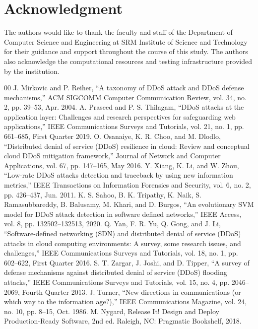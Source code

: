 \documentclass[conference]{IEEEtran}
\begin{document}
\section*{Acknowledgment}

The authors would like to thank the faculty and staff of the Department of Computer Science and Engineering at SRM Institute of Science and Technology for their guidance and support throughout the course of this study. The authors also acknowledge the computational resources and testing infrastructure provided by the institution.

\begin{thebibliography}{00}
 J. Mirkovic and P. Reiher, ``A taxonomy of DDoS attack and DDoS defense mechanisms,'' ACM SIGCOMM Computer Communication Review, vol. 34, no. 2, pp. 39--53, Apr. 2004.
 A. Praseed and P. S. Thilagam, ``DDoS attacks at the application layer: Challenges and research perspectives for safeguarding web applications,'' IEEE Communications Surveys and Tutorials, vol. 21, no. 1, pp. 661--685, First Quarter 2019.
 O. Osanaiye, K. R. Choo, and M. Dlodlo, ``Distributed denial of service (DDoS) resilience in cloud: Review and conceptual cloud DDoS mitigation framework,'' Journal of Network and Computer Applications, vol. 67, pp. 147--165, May 2016.
 Y. Xiang, K. Li, and W. Zhou, ``Low-rate DDoS attacks detection and traceback by using new information metrics,'' IEEE Transactions on Information Forensics and Security, vol. 6, no. 2, pp. 426--437, Jun. 2011.
 K. S. Sahoo, B. K. Tripathy, K. Naik, S. Ramasubbareddy, B. Balusamy, M. Khari, and D. Burgos, ``An evolutionary SVM model for DDoS attack detection in software defined networks,'' IEEE Access, vol. 8, pp. 132502--132513, 2020.
 Q. Yan, F. R. Yu, Q. Gong, and J. Li, ``Software-defined networking (SDN) and distributed denial of service (DDoS) attacks in cloud computing environments: A survey, some research issues, and challenges,'' IEEE Communications Surveys and Tutorials, vol. 18, no. 1, pp. 602--622, First Quarter 2016.
 S. T. Zargar, J. Joshi, and D. Tipper, ``A survey of defense mechanisms against distributed denial of service (DDoS) flooding attacks,'' IEEE Communications Surveys and Tutorials, vol. 15, no. 4, pp. 2046--2069, Fourth Quarter 2013.
 J. Turner, ``New directions in communications (or which way to the information age?),'' IEEE Communications Magazine, vol. 24, no. 10, pp. 8--15, Oct. 1986.
 M. Nygard, Release It! Design and Deploy Production-Ready Software, 2nd ed. Raleigh, NC: Pragmatic Bookshelf, 2018.

\end{thebibliography}
\end{document}

